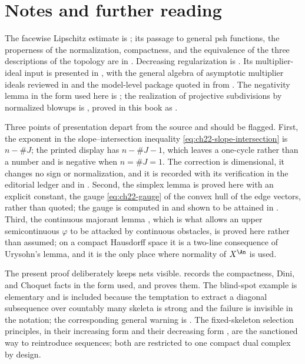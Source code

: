 \section*{Notes and further reading}

The facewise Lipschitz estimate is \cite[Theorem~6.1]{BFJ16}; its passage to
general psh functions, the properness of the normalization, compactness, and
the equivalence of the three descriptions of the topology are in
\cite[Section~7]{BFJ16}.  Decreasing regularization is
\cite[Theorem~8.7]{BFJ16}.  Its multiplier-ideal input is presented in
, with the general algebra of asymptotic multiplier
ideals reviewed in  and the model-level package quoted in
 from \cite[Appendix~B]{BFJ16}.  The negativity
lemma in the form used here is \cite[Lemma~1.6]{BFJ16}; the realization of
projective subdivisions by normalized blowups is
\cite[Theorem~3.15]{BFJ16}, proved in this book as
.

Three points of presentation depart from the source and should be flagged.
First, the exponent in the slope--intersection inequality
\eqref{eq:ch22-slope-intersection} is \(n-\#J\); the printed display
\cite[(6.3)]{BFJ16} has \(n-\#J-1\), which leaves a one-cycle rather than a
number and is negative when \(n=\#J=1\).  The correction is dimensional, it
changes no sign or normalization, and it is recorded with its verification
in the editorial ledger and in .  Second, the simplex
lemma is proved here with an explicit constant, the gauge
\eqref{eq:ch22-gauge} of the convex hull of the edge vectors, rather than
quoted; the gauge is computed in
 and shown to be attained in
.  Third, the continuous majorant lemma
, which is what allows an upper
semicontinuous \(\varphi\) to be attacked by continuous obstacles, is proved
here rather than assumed; on a compact Hausdorff space it is a two-line
consequence of Urysohn's lemma, and it is the only place where normality of
\(X^{\An}\) is used.

The present proof deliberately keeps nets visible.   records
the compactness, Dini, and Choquet facts in the form used, and
 proves them.  The blind-spot example
 is elementary and is included because
the temptation to extract a diagonal subsequence over countably many
skeleta is strong and the failure is invisible in the notation; the
corresponding general warning is
.  The fixed-skeleton selection
principles, in their increasing form
 and their decreasing form
, are the sanctioned way to
reintroduce sequences; both are restricted to one compact dual complex by
design.

